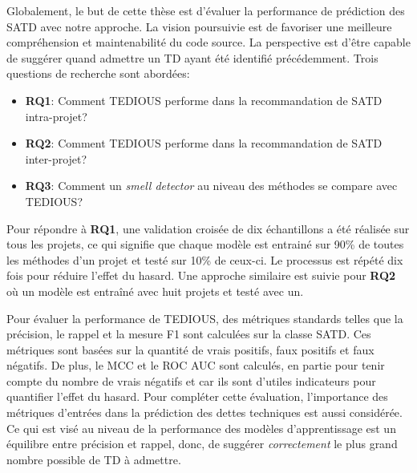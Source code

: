 Globalement, le but de cette th\`{e}se est d'\'{e}valuer la performance de pr\'{e}diction des \ac{SATD} avec notre approche. La vision poursuivie est de favoriser une meilleure compr\'{e}hension et maintenabilit\'{e} du code source. La perspective est d'\^{e}tre capable de sugg\'{e}rer quand admettre un \ac{TD} ayant \'{e}t\'{e} identifi\'{e} pr\'{e}c\'{e}demment. Trois questions de recherche sont abord\'{e}es: \par

\begin{itemize}
	\item \textbf{RQ1}: Comment \ac{TEDIOUS} performe dans la recommandation de \ac{SATD} intra-projet? 
	\item \textbf{RQ2}: Comment \ac{TEDIOUS} performe dans la recommandation de \ac{SATD} inter-projet?
	\item \textbf{RQ3}: Comment un \emph{smell detector} au niveau des m\'{e}thodes se compare avec \ac{TEDIOUS}?
\end{itemize}

Pour r\'{e}pondre \`{a} \textbf{RQ1}, une validation crois\'{e}e de dix \'{e}chantillons a \'{e}t\'{e} r\'{e}alis\'{e}e sur tous les projets, ce qui signifie que chaque mod\`{e}le est entrain\'{e} sur 90\% de toutes les m\'{e}thodes d'un projet et test\'{e} sur 10\% de ceux-ci.  Le processus est r\'{e}p\'{e}t\'{e} dix fois pour r\'{e}duire l'effet du hasard. Une approche similaire est suivie pour \textbf{RQ2} o\`{u} un mod\`{e}le est entra\^{i}n\'{e} avec huit projets et test\'{e} avec un. \par

Pour \'{e}valuer la performance de \ac{TEDIOUS}, des m\'{e}triques standards telles que la pr\'{e}cision, le rappel et la mesure F1 sont calcul\'{e}es sur la classe \ac{SATD}. Ces m\'{e}triques sont bas\'{e}es sur la quantit\'{e} de vrais positifs, faux positifs et faux n\'{e}gatifs. De plus, le \ac{MCC} et le \ac{ROC} \ac{AUC} sont calcul\'{e}s, en partie pour tenir compte du nombre de vrais n\'{e}gatifs et car ils sont d'utiles indicateurs pour quantifier l'effet du hasard. Pour compl\'{e}ter cette \'{e}valuation, l'importance des m\'{e}triques d'entr\'{e}es dans la pr\'{e}diction des dettes techniques est aussi consid\'{e}r\'{e}e. Ce qui est vis\'{e} au niveau de la performance des mod\`{e}les d'apprentissage est un \'{e}quilibre entre pr\'{e}cision et rappel, donc, de sugg\'{e}rer \emph{correctement} le plus grand nombre possible de \ac{TD} \`{a} admettre. \par

